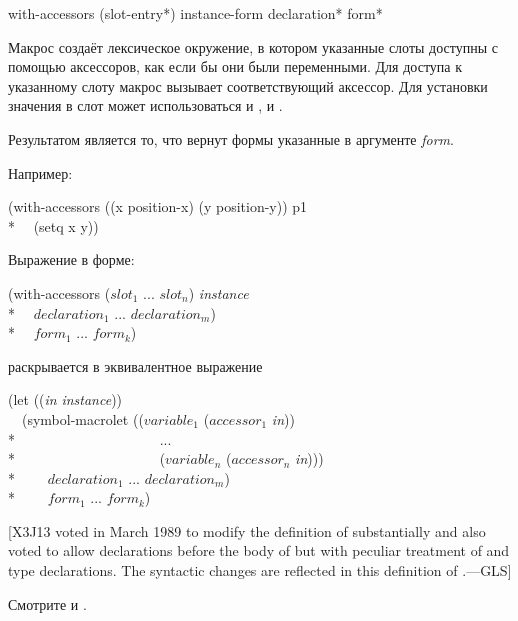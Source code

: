\begin{defmac}
with-accessors ({slot-entry}*) instance-form
     {declaration}* {form}*

Макрос  создаёт лексическое окружение, в котором указанные
слоты доступны с помощью аксессоров, как если бы они были переменными. Для
доступа к указанному слоту макрос  вызывает соответствующий
аксессор. Для установки значения в слот может
использоваться и , и .

Результатом является то, что вернут формы указанные в аргументе \emph{form}.

Например:

\begin{lisp}
(with-accessors ((x position-x) (y position-y)) p1 \\*
~~(setq x y))
\end{lisp}

Выражение  в форме:
\begin{lisp}
(with-accessors (\textrm{$slot_1$} ... \textrm{$slot_{n}$}) \emph{instance} \\*
~~$declaration_1$ ... $declaration_{m}$) \\*
~~$form_1$ ... $form_{k}$)
\end{lisp}
раскрывается в эквивалентное выражение
\begin{lisp}
(let ((\emph{in} \emph{instance})) \\
~~(symbol-macrolet ((\textrm{$variable_1$} (\textrm{$accessor_1$} \emph{in})) \\*
~~~~~~~~~~~~~~~~~~~~... \\*
~~~~~~~~~~~~~~~~~~~~(\textrm{$variable_{n}$} (\textrm{$accessor_{n}$} \emph{in}))) \\*
~~~~$declaration_1$ ... $declaration_{m}$) \\*
~~~~$form_1$ ... $form_{k}$)
\end{lisp}

[X3J13 voted in March 1989
to modify the definition of  substantially
and also voted
 to allow declarations before the body
of  but with peculiar treatment of 
and type declarations.  The syntactic changes are reflected in this definition
of .---GLS]

Смотрите  и .
\end{defmac}


